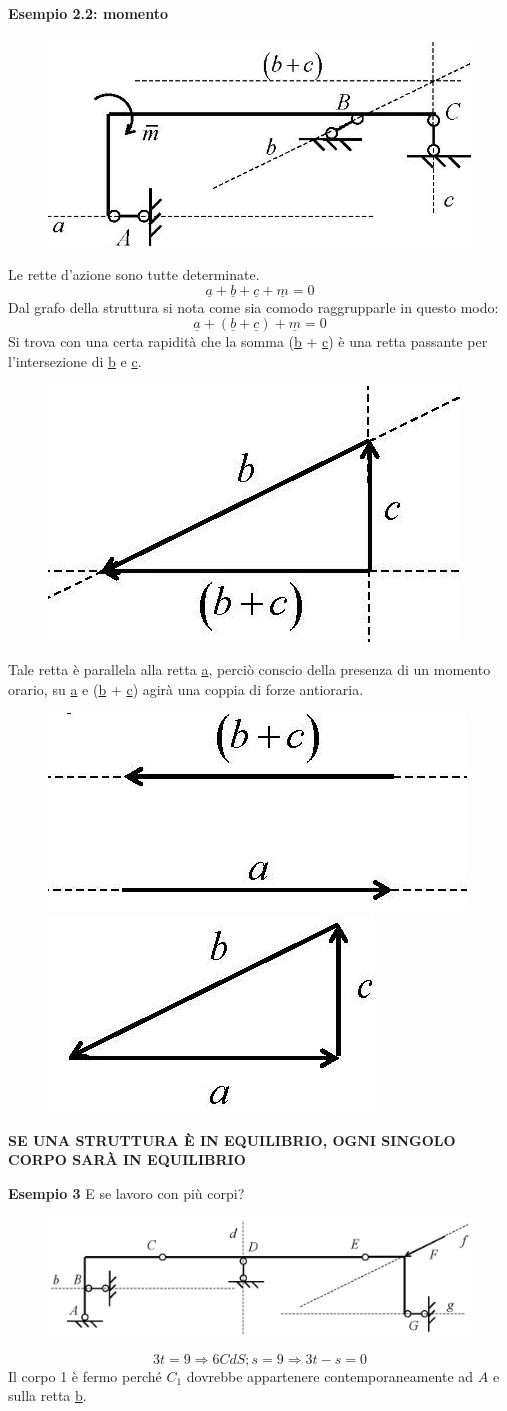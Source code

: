 \documentclass{article}
\begin{document}
\begin{adjustwidth}{2in}{}
\textbf{Esempio 2.2: momento} 
\begin{figure}[H]
	\centering
	\includegraphics[width=0.4\linewidth]{immagini/1.PARTE4_Pagina_28 (3)}
\end{figure}
Le rette d’azione sono tutte determinate.
\[
\underline{a} + \underline{b} + \underline{c} + \underline{m}= 0 
\]
Dal grafo della struttura si nota come sia comodo raggrupparle in questo modo:
\[
\underline{a} + (\underline{b} + \underline{c}) + \underline{m}= 0 
\]
Si trova con una certa rapidità che la somma  (\underline{b} + \underline{c}) è una retta passante per l'intersezione di \underline{b} e \underline{c}.
\begin{figure}[H]
	\centering
	\includegraphics[width=0.15\linewidth]{immagini/1.PARTE4_Pagina_28 (2)}
\end{figure}

Tale retta è parallela alla retta \underline{a}, perciò conscio della presenza di un momento orario, su \underline{a} e (\underline{b} + \underline{c}) agirà una coppia di forze antioraria.
\begin{figure}[H]
	\centering
	\includegraphics[width=0.15\linewidth]{immagini/1.PARTE4_Pagina_28 (4)}
		\includegraphics[width=0.15\linewidth]{immagini/1.PARTE4_Pagina_28}
\end{figure}

\begin{center}
	{\textbf{SE UNA STRUTTURA È IN EQUILIBRIO, OGNI SINGOLO CORPO SARÀ IN EQUILIBRIO}} 
\end{center}

\textbf{Esempio 3} \newline
E se lavoro con più corpi?

\begin{figure}[H]
	\centering
	\includegraphics[width=0.5\linewidth]{immagini/1.PARTE4_Pagina_29}
\end{figure}
\[ 3t = 9 \Rightarrow 6 CdS;  s = 9 \Rightarrow 3t - s = 0\]
Il corpo 1 è fermo perché $C_1$ dovrebbe appartenere contemporaneamente ad $A$ e sulla retta \underline{b}. 


\end{adjustwidth}
\end{document}
